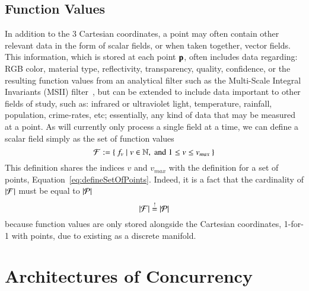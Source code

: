%
%
%
\subsection{Function Values}
\label{ch2s3ssFV}
In addition to the 3 Cartesian coordinates, a point may often contain other relevant data in the form of scalar fields, or when taken together, vector fields. This information, which is stored at each point $\mathbf{p}$, often includes data regarding: RGB color, material type, reflectivity, transparency, quality, confidence, or the resulting function values from an analytical filter such as the Multi-Scale Integral Invariants (MSII) filter~\cite[p.~21]{Mara12}, but can be extended to include data important to other fields of study, such as: infrared or ultraviolet light, temperature, rainfall, population, crime-rates, etc; essentially, any kind of data that may be measured at a point. As  will currently only process a single field at a time, we can define a scalar field simply as the set of function values
%
\begin{equation}
	\mathcal{F} := \left \{\: f_v \mid v \in \mathbb{N}, \;\text{and}\; 1\leq v \leq v_{max} \:\right \}
	\label{eq:defineSetOfFunctionValues}
\end{equation}%
%
%
%
This definition shares the indices $v$ and $v_{max}$ with the definition for a set of points, Equation~\ref{eq:defineSetOfPoints}. Indeed, it is a fact that the cardinality of $|\mathcal{F}|$ must be equal to $|\mathcal{P}|$
%
\begin{equation}
	|\mathcal{F}| \overset{!}{=} |\mathcal{P}|
\end{equation}
%
because function values are only stored alongside the Cartesian coordinates, 1-for-1 with points, due to \tdd{} existing as a discrete manifold.

%
%
%
%
%
\section{Architectures of Concurrency}

%
